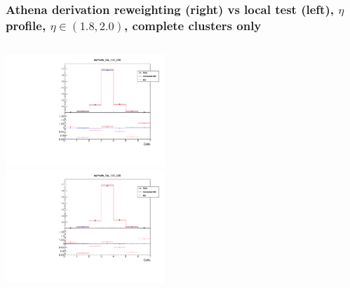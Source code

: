 \documentclass{beamer}
\begin{document}

\begin{frame}
\frametitle{Athena derivation reweighting (right) vs local test (left), $\eta$ profile, $\eta \in (1.8, 2.0)$, complete clusters only}

\begin{columns}[t]

\centering
\includegraphics[width=6cm]{etaProfile_Eta_18_20_Athena.pdf}\\
\centering
\includegraphics[width=6cm]{etaProfile_Rew_Eta_18_20_Local_Rew_noBS.pdf}\\
\end{columns}
\end{frame}
\end{document}
